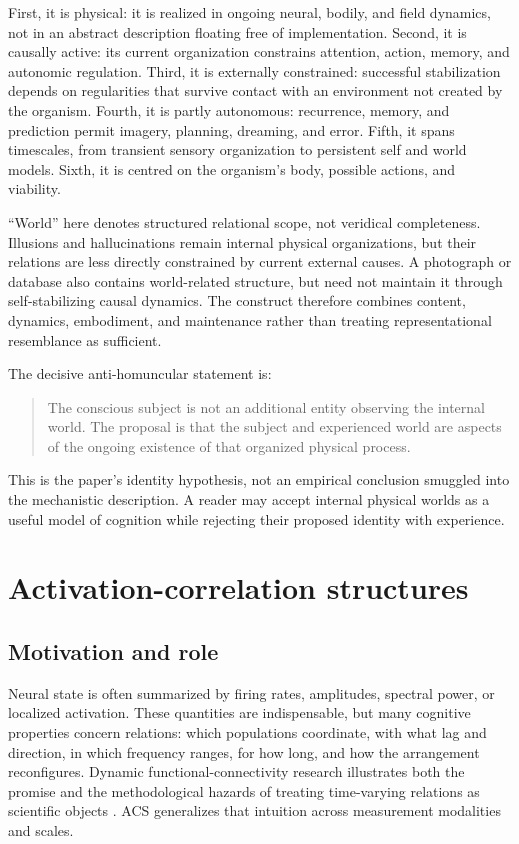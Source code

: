 \documentclass[
  11pt,
  a4paper,
]{article}
\begin{document}
First, it is physical: it is realized in ongoing neural, bodily, and
field dynamics, not in an abstract description floating free of
implementation. Second, it is causally active: its current organization
constrains attention, action, memory, and autonomic regulation. Third,
it is externally constrained: successful stabilization depends on
regularities that survive contact with an environment not created by the
organism. Fourth, it is partly autonomous: recurrence, memory, and
prediction permit imagery, planning, dreaming, and error. Fifth, it
spans timescales, from transient sensory organization to persistent self
and world models. Sixth, it is centred on the organism's body, possible
actions, and viability.

``World'' here denotes structured relational scope, not veridical
completeness. Illusions and hallucinations remain internal physical
organizations, but their relations are less directly constrained by
current external causes. A photograph or database also contains
world-related structure, but need not maintain it through
self-stabilizing causal dynamics. The construct therefore combines
content, dynamics, embodiment, and maintenance rather than treating
representational resemblance as sufficient.

The decisive anti-homuncular statement is:

\begin{quote}
The conscious subject is not an additional entity observing the internal
world. The proposal is that the subject and experienced world are
aspects of the ongoing existence of that organized physical process.
\end{quote}

This is the paper's identity hypothesis, not an empirical conclusion
smuggled into the mechanistic description. A reader may accept internal
physical worlds as a useful model of cognition while rejecting their
proposed identity with experience.

\section{Activation-correlation
structures}\label{activation-correlation-structures}

\subsection{Motivation and role}\label{motivation-and-role}

Neural state is often summarized by firing rates, amplitudes, spectral
power, or localized activation. These quantities are indispensable, but
many cognitive properties concern relations: which populations
coordinate, with what lag and direction, in which frequency ranges, for
how long, and how the arrangement reconfigures. Dynamic
functional-connectivity research illustrates both the promise and the
methodological hazards of treating time-varying relations as scientific
objects \citep{hutchison2013}. ACS generalizes that intuition across
measurement modalities and scales.
\end{document}

